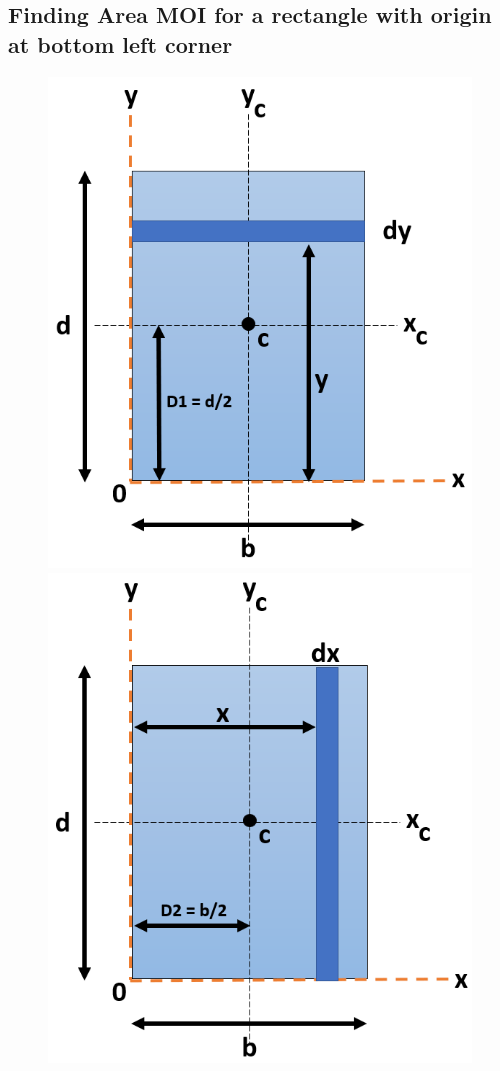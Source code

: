 \documentclass[8pt]{report}
\begin{document}
	\subsection{Finding Area MOI for a rectangle with origin at bottom left corner}
		\begin{figure}[H]
				\centering
				\includegraphics[scale=0.4]{rectangleMOIcorner_Ix.png}\hspace{3cm}
				\includegraphics[scale=0.4]{rectangleMOIcorner_Iy.png}
		\end{figure}
\end{document}
